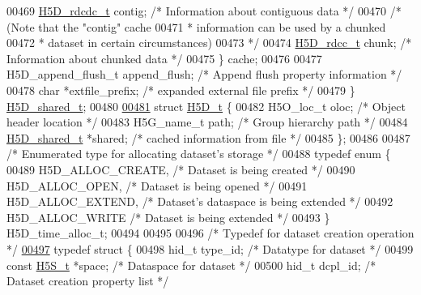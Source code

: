 \begin{DoxyCode}
00469         \hyperlink{struct_h5_d__rdcdc__t}{H5D\_rdcdc\_t}     contig;         \textcolor{comment}{/* Information about contiguous data */}
00470                                         \textcolor{comment}{/* (Note that the "contig" cache}
00471 \textcolor{comment}{                                         * information can be used by a chunked}
00472 \textcolor{comment}{                                         * dataset in certain circumstances)}
00473 \textcolor{comment}{                                         */}
00474         \hyperlink{struct_h5_d__rdcc__t}{H5D\_rdcc\_t}      chunk;          \textcolor{comment}{/* Information about chunked data */}
00475     \} cache;
00476 
00477     H5D\_append\_flush\_t  append\_flush;   \textcolor{comment}{/* Append flush property information */}
00478     \textcolor{keywordtype}{char}                *extfile\_prefix; \textcolor{comment}{/* expanded external file prefix */}
00479 \} \hyperlink{struct_h5_d__shared__t}{H5D\_shared\_t};
00480 
\hyperlink{struct_h5_d__t}{00481} \textcolor{keyword}{struct }\hyperlink{struct_h5_d__t}{H5D\_t} \{
00482     H5O\_loc\_t           oloc;           \textcolor{comment}{/* Object header location       */}
00483     H5G\_name\_t          path;           \textcolor{comment}{/* Group hierarchy path         */}
00484     \hyperlink{struct_h5_d__shared__t}{H5D\_shared\_t}        *shared;        \textcolor{comment}{/* cached information from file */}
00485 \};
00486 
00487 \textcolor{comment}{/* Enumerated type for allocating dataset's storage */}
00488 \textcolor{keyword}{typedef} \textcolor{keyword}{enum} \{
00489     H5D\_ALLOC\_CREATE,           \textcolor{comment}{/* Dataset is being created */}
00490     H5D\_ALLOC\_OPEN,             \textcolor{comment}{/* Dataset is being opened */}
00491     H5D\_ALLOC\_EXTEND,           \textcolor{comment}{/* Dataset's dataspace is being extended */}
00492     H5D\_ALLOC\_WRITE             \textcolor{comment}{/* Dataset is being extended */}
00493 \} H5D\_time\_alloc\_t;
00494 
00495 
00496 \textcolor{comment}{/* Typedef for dataset creation operation */}
\hyperlink{struct_h5_d__obj__create__t}{00497} \textcolor{keyword}{typedef} \textcolor{keyword}{struct }\{
00498     hid\_t type\_id;              \textcolor{comment}{/* Datatype for dataset */}
00499     \textcolor{keyword}{const} \hyperlink{struct_h5_s__t}{H5S\_t} *space;         \textcolor{comment}{/* Dataspace for dataset */}
00500     hid\_t dcpl\_id;              \textcolor{comment}{/* Dataset creation property list */}

\end{DoxyCode}

